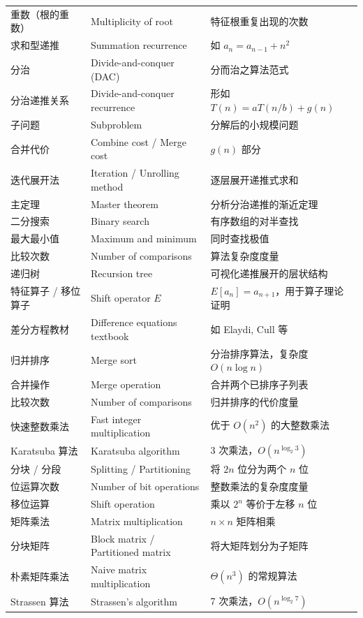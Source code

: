 \documentclass[UTF8,11pt,a4paper]{ctexbook}   %
\theoremstyle{definition}
\begin{document}
\begin{longtable}{|p{4.8cm}|p{4.8cm}|p{4.8cm}|}
重数（根的重数） & Multiplicity of root & 特征根重复出现的次数 \\
求和型递推 & Summation recurrence & 如 $a_n=a_{n-1}+n^2$ \\
分治 & Divide-and-conquer (DAC) & 分而治之算法范式 \\
分治递推关系 & Divide-and-conquer recurrence & 形如 $T(n)=aT(n/b)+g(n)$ \\
子问题 & Subproblem & 分解后的小规模问题 \\
合并代价 & Combine cost / Merge cost & $g(n)$ 部分 \\
迭代展开法 & Iteration / Unrolling method & 逐层展开递推式求和 \\
主定理 & Master theorem & 分析分治递推的渐近定理 \\
二分搜索 & Binary search & 有序数组的对半查找 \\
最大最小值 & Maximum and minimum & 同时查找极值 \\
比较次数 & Number of comparisons & 算法复杂度度量 \\
递归树 & Recursion tree & 可视化递推展开的层状结构 \\
特征算子 / 移位算子 & Shift operator $E$ & $E[a_n]=a_{n+1}$，用于算子理论证明 \\
差分方程教材 & Difference equations textbook & 如 Elaydi, Cull 等 \\
\hline
归并排序 & Merge sort & 分治排序算法，复杂度 $O(n\log n)$ \\
合并操作 & Merge operation & 合并两个已排序子列表 \\
比较次数 & Number of comparisons & 归并排序的代价度量 \\
快速整数乘法 & Fast integer multiplication & 优于 $O(n^2)$ 的大整数乘法 \\
Karatsuba 算法 & Karatsuba algorithm & 3 次乘法，$O(n^{\log_2 3})$ \\
分块 / 分段 & Splitting / Partitioning & 将 $2n$ 位分为两个 $n$ 位 \\
位运算次数 & Number of bit operations & 整数乘法的复杂度度量 \\
移位运算 & Shift operation & 乘以 $2^n$ 等价于左移 $n$ 位 \\
矩阵乘法 & Matrix multiplication & $n\times n$ 矩阵相乘 \\
分块矩阵 & Block matrix / Partitioned matrix & 将大矩阵划分为子矩阵 \\
朴素矩阵乘法 & Naive matrix multiplication & $\Theta(n^3)$ 的常规算法 \\
Strassen 算法 & Strassen's algorithm & 7 次乘法，$O(n^{\log_2 7})$ \\

\end{longtable}
\end{document}
